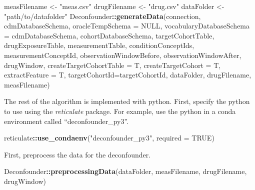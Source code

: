 \documentclass[]{article}
\newenvironment{Shaded}{\begin{snugshade}}{\end{snugshade}}
\newcommand{\DataTypeTok}[1]{\textcolor[rgb]{0.13,0.29,0.53}{#1}}
\newcommand{\KeywordTok}[1]{\textcolor[rgb]{0.13,0.29,0.53}{\textbf{#1}}}
\newcommand{\NormalTok}[1]{#1}
\newcommand{\OperatorTok}[1]{\textcolor[rgb]{0.81,0.36,0.00}{\textbf{#1}}}
\newcommand{\OtherTok}[1]{\textcolor[rgb]{0.56,0.35,0.01}{#1}}
\newcommand{\StringTok}[1]{\textcolor[rgb]{0.31,0.60,0.02}{#1}}
\begin{document}
\begin{Shaded}
\begin{Highlighting}[]
\NormalTok{measFilename \textless{}{-}}\StringTok{ "meas.csv"}
\NormalTok{drugFilename \textless{}{-}}\StringTok{ "drug.csv"}
\NormalTok{dataFolder \textless{}{-}}\StringTok{ "path/to/datafolder"}
\NormalTok{Deconfounder}\OperatorTok{::}\KeywordTok{generateData}\NormalTok{(connection,}
\NormalTok{             cdmDatabaseSchema,}
             \DataTypeTok{oracleTempSchema =} \OtherTok{NULL}\NormalTok{,}
             \DataTypeTok{vocabularyDatabaseSchema =}\NormalTok{ cdmDatabaseSchema,}
\NormalTok{             cohortDatabaseSchema,}
\NormalTok{             targetCohortTable,}
\NormalTok{             drugExposureTable,}
\NormalTok{             measurementTable,}
\NormalTok{             conditionConceptIds,}
\NormalTok{             measurementConceptId,}
\NormalTok{             observationWindowBefore,}
\NormalTok{             observationWindowAfter,}
\NormalTok{             drugWindow,}
             \DataTypeTok{createTargetCohortTable =}\NormalTok{ T,}
             \DataTypeTok{createTargetCohort =}\NormalTok{ T,}
             \DataTypeTok{extractFeature =}\NormalTok{ T,}
             \DataTypeTok{targetCohortId=}\NormalTok{targetCohortId,}
\NormalTok{             dataFolder,}
\NormalTok{             drugFilename,}
\NormalTok{             measFilename)}
\end{Highlighting}
\end{Shaded}

The rest of the algorithm is implemented with python. First, specify the
python to use using the \emph{reticulate} package. For example, use the
python in a conda environment called ``deconfounder\_py3''.

\begin{Shaded}
\begin{Highlighting}[]
\NormalTok{reticulate}\OperatorTok{::}\KeywordTok{use\_condaenv}\NormalTok{(}\StringTok{"deconfounder\_py3"}\NormalTok{, }\DataTypeTok{required =} \OtherTok{TRUE}\NormalTok{)}
\end{Highlighting}
\end{Shaded}

First, preprocess the data for the deconfounder.

\begin{Shaded}
\begin{Highlighting}[]
\NormalTok{Deconfounder}\OperatorTok{::}\KeywordTok{preprocessingData}\NormalTok{(dataFolder, measFilename, drugFilename, drugWindow)}
\end{Highlighting}
\end{Shaded}
\end{document}
